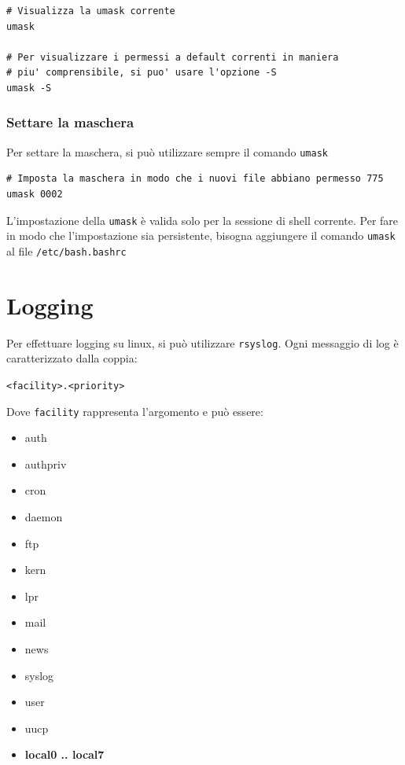 \documentclass[a4paper]{report}
\newenvironment{ricordati}{\begin{tcolorbox}[fonttitle=\sffamily\bfseries\large,title=Ricordati,colframe=orange!75!white]}{\end{tcolorbox}}
\newenvironment{code}{\begin{tcolorbox}[size=small]}{\end{tcolorbox}}
\begin{document}
\begin{code} 
\begin{lstlisting}
# Visualizza la umask corrente
umask

# Per visualizzare i permessi a default correnti in maniera
# piu' comprensibile, si puo' usare l'opzione -S
umask -S
\end{lstlisting}
\end{code}

\subsection{Settare la maschera}

Per settare la maschera, si può utilizzare sempre il comando \texttt{umask}

\begin{code} 
\begin{lstlisting}
# Imposta la maschera in modo che i nuovi file abbiano permesso 775
umask 0002
\end{lstlisting}
\end{code}

\begin{ricordati}
	L'impostazione della \texttt{umask} è valida solo per la sessione di shell corrente. Per fare in modo che l'impostazione sia persistente, bisogna aggiungere il comando \texttt{umask} al file \texttt{/etc/bash.bashrc}
\end{ricordati}

\chapter{Logging}
\label{chap:logging}
Per effettuare logging su linux, si può utilizzare \texttt{rsyslog}. Ogni messaggio di log è caratterizzato dalla coppia:


\begin{center}
	\texttt{<facility>.<priority>}
\end{center}


Dove \texttt{facility} rappresenta l'argomento e può essere:
\begin{multicols}{4}
\begin{itemize}
	\item auth
	\item authpriv
	\item cron
	\item daemon
	\item ftp
	\item kern
	\item lpr
	\item mail
	\item news
	\item syslog
	\item user
	\item uucp
	\item \textbf{local0 .. local7}
\end{itemize}
\end{multicols}
\end{document}
